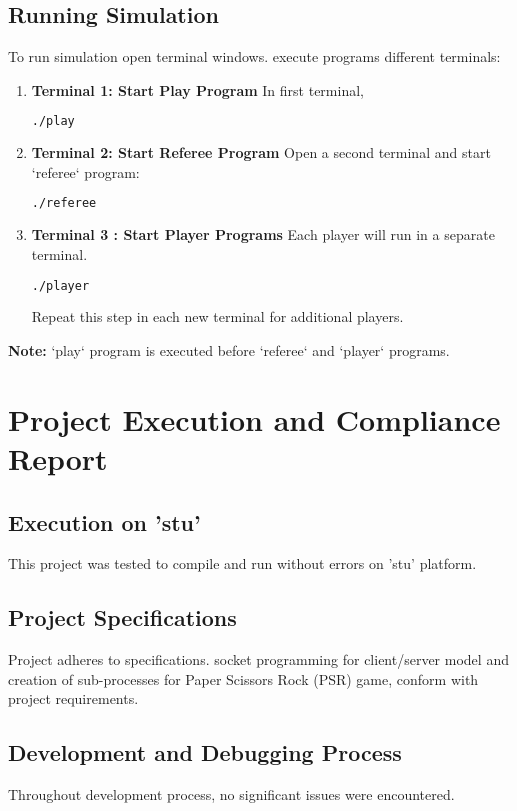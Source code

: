 \documentclass{article}
\begin{document}
\subsection{Running Simulation}
To run simulation open terminal windows. execute programs different terminals:

\begin{enumerate}
    \item \textbf{Terminal 1: Start Play Program}
    In first terminal, 
    \begin{lstlisting}[language=bash]
    ./play
    \end{lstlisting}

    \item \textbf{Terminal 2: Start Referee Program}
    Open a second terminal and start `referee` program:
    \begin{lstlisting}[language=bash]
    ./referee
    \end{lstlisting}

    \item \textbf{Terminal 3 : Start Player Programs}
    Each player will run in a separate terminal. 
    \begin{lstlisting}[language=bash]
    ./player
    \end{lstlisting}
    Repeat this step in each new terminal for additional players.
\end{enumerate}

\textbf{Note:}  `play` program is executed before `referee` and `player` programs.

\section{Project Execution and Compliance Report}

\subsection{Execution on 'stu'}
This project was tested to compile and run without errors on 'stu' platform. 

\subsection{Project Specifications}
Project adheres to specifications. socket programming for client/server model and creation of sub-processes for Paper Scissors Rock (PSR) game, conform with project requirements.

\subsection{Development and Debugging Process}
Throughout development process, no significant issues were encountered. 
\end{document}
